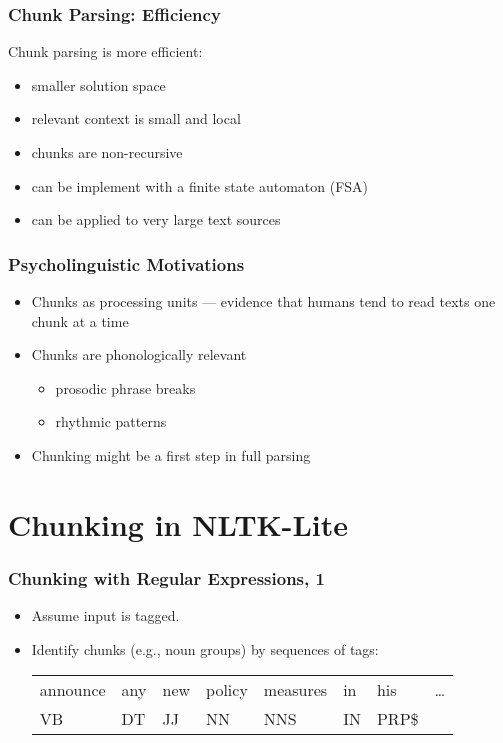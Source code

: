 \begin{frame}[fragile]
  \frametitle{Chunk Parsing: Efficiency}

Chunk parsing is more efficient:

  \begin{itemize}
    \item smaller solution space
    \item relevant context is small and local
    \item chunks are non-recursive
    \item can be implement with a finite state automaton (FSA)
    \item can be applied to very large text sources
  \end{itemize}

\end{frame}

\begin{frame}[fragile]
 \frametitle{Psycholinguistic Motivations}

 \begin{itemize}
   \item Chunks as processing units --- evidence that humans tend to
     read texts one chunk at a time
   \item Chunks are phonologically relevant
     \begin{itemize}
       \item prosodic phrase breaks
       \item rhythmic patterns
     \end{itemize}
   \item Chunking might be a first step in full parsing
 \end{itemize}

\end{frame}


\section{Chunking in NLTK-Lite}

\begin{frame}[fragile]
  \frametitle{Chunking with Regular Expressions, 1}

  \begin{itemize}
  \item Assume input is tagged.
    \item Identify chunks (e.g., noun groups) by sequences of tags:
\smallskip

      \begin{tabular}[t]{llllllll}
        announce &  any &  new & policy & measures & in & his & \ldots \\
        VB       &  DT  &  JJ  & NN     & NNS      & IN & PRP\$ & \\
      \end{tabular}
  \end{itemize}

\end{frame}


